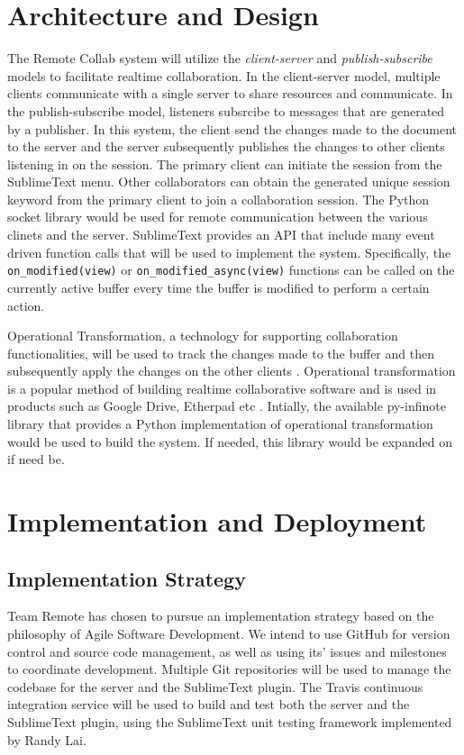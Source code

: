 \documentclass[11pt,english]{article}
\begin{document}
\section{Architecture and Design}
		The Remote Collab system will utilize the \textit{client-server} and \textit{publish-subscribe} models to facilitate realtime collaboration. In the client-server model, multiple clients communicate with a single server to share resources and communicate. In the publish-subscribe model, listeners subsrcibe to messages that are generated by a publisher. In this system, the client send the changes made to the document to the server and the server subsequently publishes the changes to other clients listening in on the session. The primary client can initiate the session from the SublimeText menu. Other collaborators can obtain the generated unique session keyword from the primary client to join a collaboration session. The Python socket library would be used for remote communication between the various clinets and the server. SublimeText provides an API that include many event driven function calls that will be used to implement the system. Specifically, the \texttt{on\_modified(view)} or \texttt{on\_modified\_async(view)} functions can be called on the currently active buffer every time the buffer is modified to perform a certain action. 

		Operational Transformation, a technology for supporting collaboration functionalities, will be used to track the changes made to the buffer and then subsequently apply the changes on the other clients \cite{} \cite{} \cite{}.  Operational transformation is a popular method of building realtime collaborative software and is used in products such as Google Drive, Etherpad etc \cite{}. Intially, the available py-infinote library that provides a Python implementation of operational transformation would be used to build the system. If needed, this library would be expanded on if need be.

\section{Implementation and Deployment}
	\subsection{Implementation Strategy}
	\label{sec:implementation}
		Team Remote has chosen to pursue an implementation strategy based on the philosophy of Agile Software Development. We intend to use GitHub\cite{github} for version control and source code management, as well as using its' issues and milestones to coordinate development. Multiple Git repositories will be used to manage the codebase for the server and the SublimeText plugin. The Travis continuous integration service\cite{travis-ci} will be used to build and test both the server and the SublimeText plugin, using the SublimeText unit testing framework\cite{unittest} implemented by Randy Lai.
\end{document}
